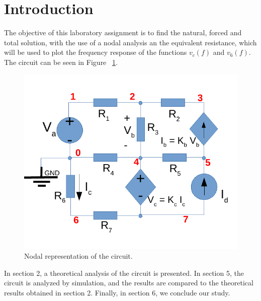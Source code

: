 \section{Introduction}
\label{sec:introduction}

The objective of this laboratory assignment is to find the natural, forced and total solution, with the use of a nodal analysis an the equivalent resistance, which will be used to plot the frequency response of the functions $v_c(f)$ and $v_6(f)$. The circuit can be seen in Figure ~\ref{fig:rc}. 

\begin{figure}[h] \centering
\includegraphics[width=0.6\linewidth]{rcm.pdf}
\caption{Nodal representation of the circuit.}
\label{fig:rc}
\end{figure}


In section 2, a theoretical analysis of the circuit is presented. In section 5, the circuit is analyzed by simulation, and the results are compared to the theoretical results obtained in section 2. Finally, in section 6, we conclude our study.


